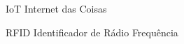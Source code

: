 \begin{siglas}
  \item[IoT] Internet das Coisas
  \item[RFID] Identificador de Rádio Frequência
\end{siglas}